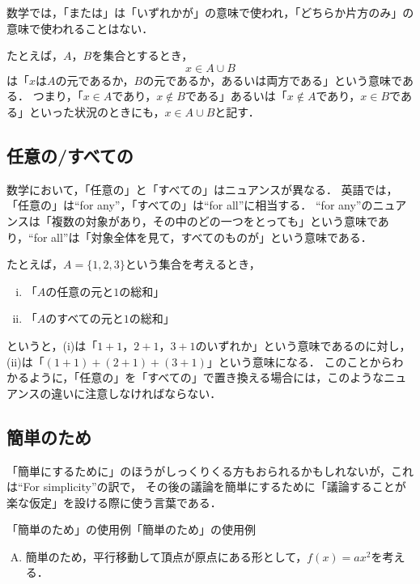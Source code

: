 数学では，「または」は「いずれかが」の意味で使われ，「どちらか片方のみ」の意味で使われることはない．

たとえば，$A$，$B$を集合とするとき，
\[
  x \in A \cup B
\]
は「$x$は$A$の元であるか，$B$の元であるか，あるいは両方である」という意味である．
つまり，「$ x \in A$であり，$x \notin  B$である」あるいは「$ x \notin A$であり，$x \in B$である」といった状況のときにも，$x \in A \cup B$と記す．

\subsection{任意の/すべての}

数学において，「任意の」と「すべての」はニュアンスが異なる．
英語では，「任意の」は``for any''，「すべての」は``for all''に相当する．
``for any''のニュアンスは「複数の対象があり，その中のどの一つをとっても」という意味であり，``for all''は「対象全体を見て，すべてのものが」という意味である．

たとえば，$A = \{1,2,3\}$という集合を考えるとき，

\begin{enumerate}[(i)]
  \item 「$A$の任意の元と$1$の総和」
  \item 「$A$のすべての元と$1$の総和」
\end{enumerate}

というと，(i)は「$1+1$，$2+1$，$3+1$のいずれか」という意味であるのに対し，(ii)は「$(1+1)+(2+1)+(3+1)$」という意味になる．
このことからわかるように，「任意の」を「すべての」で置き換える場合には，このようなニュアンスの違いに注意しなければならない．

\subsection{簡単のため}

「簡単にするために」のほうがしっくりくる方もおられるかもしれないが，これは``For simplicity''の訳で，
その後の議論を簡単にするために「議論することが楽な仮定」を設ける際に使う言葉である．

\begin{example}{「簡単のため」の使用例}{「簡単のため」の使用例}
  \begin{enumerate}[(A)]
    \item 簡単のため，平行移動して頂点が原点にある形として，$f(x)=ax^2$を考える．
  \end{enumerate}
\end{example}

